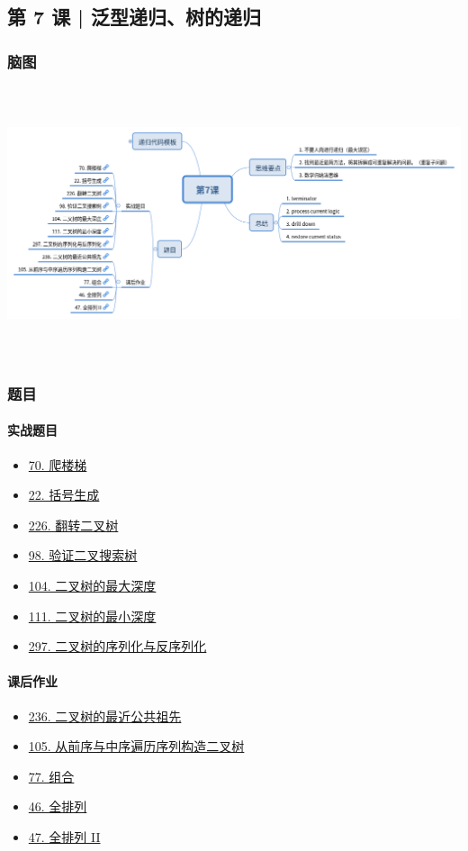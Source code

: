 \subsection{第 7 课 | 泛型递归、树的递归}

\subsubsection{脑图}

\includegraphics[width=170mm,height=80mm]{images/第7课.png}

\subsubsection{题目}

\paragraph{实战题目}

\begin{itemize}
  \item \hyperref[leetcode:70]{70. 爬楼梯}
  \item \hyperref[leetcode:22]{22. 括号生成}
  \item \hyperref[leetcode:226]{226. 翻转二叉树}
  \item \hyperref[leetcode:98]{98. 验证二叉搜索树}
  \item \hyperref[leetcode:104]{104. 二叉树的最大深度}
  \item \hyperref[leetcode:111]{111. 二叉树的最小深度}
  \item \hyperref[leetcode:297]{297. 二叉树的序列化与反序列化}
\end{itemize}

\paragraph{课后作业}

\begin{itemize}
  \item \hyperref[leetcode:236]{236. 二叉树的最近公共祖先}
  \item \hyperref[leetcode:105]{105. 从前序与中序遍历序列构造二叉树}
  \item \hyperref[leetcode:77]{77. 组合}
  \item \hyperref[leetcode:46]{46. 全排列}
  \item \hyperref[leetcode:47]{47. 全排列 II}
\end{itemize}
